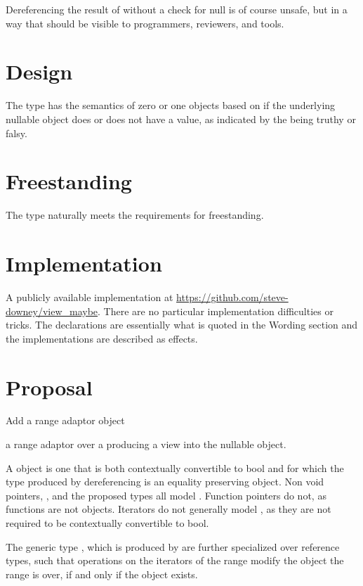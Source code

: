 \documentclass[a4paper,10pt,oneside,openany,final,article]{memoir}
\begin{document}
Dereferencing the result of  without a check for null is of course unsafe, but in a way that should be visible to programmers, reviewers,  and tools.

\chapter{Design}

The type  has the semantics of zero or one objects based on if the underlying nullable object does or does not have a value, as indicated by the  being truthy or falsy.

\chapter{Freestanding}


The type  naturally meets the requirements for freestanding.

\chapter{Implementation}


A publicly available implementation at \url{https://github.com/steve-downey/view_maybe}. There are no particular implementation difficulties or tricks. The declarations are essentially what is quoted in the Wording section and the implementations are described as effects.


\chapter{Proposal}


Add a range adaptor object

   a range adaptor over a  producing a view into the nullable object.

A  object is one that is both contextually convertible to bool and for which the type produced by dereferencing is an equality preserving object. Non void pointers, , and the proposed  \cite{P0323R9} types all model . Function pointers do not, as functions are not objects. Iterators do not generally model , as they are not required to be contextually convertible to bool.

The generic type  , which is produced by  are further specialized over reference types, such that operations on the iterators of the range modify the object the range is over, if and only if the object exists.
\end{document}
